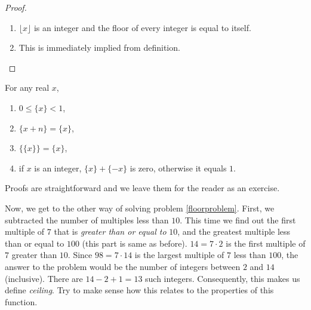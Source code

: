 \documentclass[12pt]{subfile}
\begin{document}
\begin{proof}
\begin{enumerate}[1.]
        		\item $\lfloor x\rfloor$ is an integer and the floor of every integer is equal to itself.
        		\item This is immediately implied from definition. 
        	\end{enumerate} 
        \end{proof}
    
	    \begin{proposition}
	    	For any real $x$,
	    	\begin{enumerate}[1.]
	    		\item $0\leq\{x\}<1$,
	    		\item  $\{ x+n\}=\{ x\}$,
	    		\item $\{\{x\}\} =  \{x\}$,
	    		\item if $x$ is an integer, $\{ x\}+\{ -x\}$ is zero, otherwise it equals $1$.
	    	\end{enumerate}
	    \end{proposition}
    
	    Proofs are straightforward and we leave them for the reader as an exercise.
    
    
    Now, we get to the other way of solving problem \eqref{floorproblem}. First, we subtracted the number of multiples less than $10$. This time we find out the first multiple of $7$ that is \textit{greater than or equal to} $10$, and the greatest multiple less than or equal to $100$ (this part is same as before). $14=7\cdot2$ is the first multiple of $7$ greater than $10$. Since $98=7\cdot14$ is the largest multiple of $7$ less than $100$, the answer to the problem would be the number of integers between $2$ and $14$ (inclusive). There are $14-2+1=13$ such integers. Consequently, this makes us define \textit{ceiling}. Try to make sense how this relates to the properties of this function.
    
\end{document}

